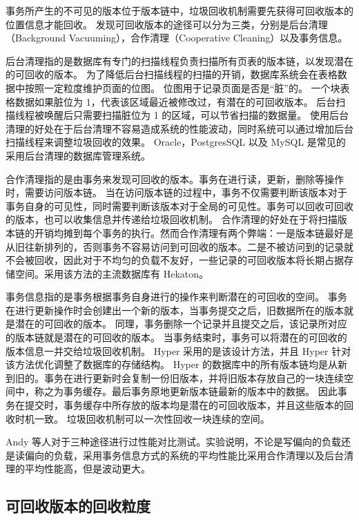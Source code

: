 事务所产生的不可见的版本位于版本链中，垃圾回收机制需要先获得可回收版本的位置信息才能回收。
发现可回收版本的途径可以分为三类，分别是后台清理（Background Vacuuming），合作清理（Cooperative Cleaning）以及事务信息。

后台清理指的是数据库有专门的扫描线程负责扫描所有页表的版本链，以发现潜在的可回收的版本。
为了降低后台扫描线程的扫描的开销，数据库系统会在表格数据中按照一定粒度维护页面的位图。
位图用于记录页面是否是“脏”的。
一个块表格数据如果脏位为 1，代表该区域最近被修改过，有潜在的可回收版本。
后台扫描线程被唤醒后只需要扫描脏位为 1 的区域，可以节省扫描的数据量。
使用后台清理的好处在于后台清理不容易造成系统的性能波动，同时系统可以通过增加后台扫描线程来调整垃圾回收的效果。
Oracle，PostgresSQL\cite{pg} 以及 MySQL 是常见的采用后台清理的数据库管理系统。

合作清理指的是由事务来发现可回收的版本。事务在进行读，更新，删除等操作时，需要访问版本链。
当在访问版本链的过程中，事务不仅需要判断该版本对于事务自身的可见性，同时需要判断该版本对于全局的可见性。事务可以回收可回收的版本，也可以收集信息并传递给垃圾回收机制。
合作清理的好处在于将扫描版本链的开销均摊到每个事务的执行。然而合作清理有两个弊端：一是版本链最好是从旧往新排列的，否则事务不容易访问到可回收的版本。二是不被访问到的记录就不会被回收，因此对于不均匀的负载不友好，一些记录的可回收版本将长期占据存储空间。采用该方法的主流数据库有 Hekaton\cite{hekaton}。

事务信息指的是事务根据事务自身进行的操作来判断潜在的可回收的空间。
事务在进行更新操作时会创建出一个新的版本，当事务提交之后，旧数据所在的版本就是潜在的可回收的版本。
同理，事务删除一个记录并且提交之后，该记录所对应的版本链就是潜在的可回收的版本。
当事务结束时，事务可以将潜在的可回收的版本信息一并交给垃圾回收机制。
Hyper\cite{hyper} 采用的是该设计方法，并且 Hyper 针对该方法优化调整了数据库的存储结构。
Hyper 的数据库中的所有版本链均是从新到旧的。事务在进行更新时会复制一份旧版本，并将旧版本存放自己的一块连续空间中，称之为事务缓存。最后事务原地更新版本链最新的版本中的数据。
因此事务在提交时，事务缓存中所存放的版本均是潜在的可回收版本，并且这些版本的回收时机一致。
垃圾回收机制可以一次性回收一块连续的空间。

Andy 等人对于三种途径进行过性能对比测试\cite{mvcc_evaluation}。实验说明，不论是写偏向的负载还是读偏向的负载，采用事务信息方式的系统的平均性能比采用合作清理以及后台清理的平均性能高，但是波动更大。


\subsection{可回收版本的回收粒度}

